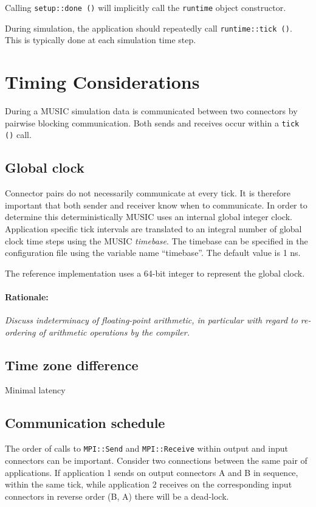 \documentclass[a4paper]{report}
\newenvironment{rationale}%
{\par\paragraph{Rationale:}}%
{\par}
\begin{document}
Calling \lstinline|setup::done ()| will implicitly call the \lstinline|runtime|
object constructor.

During simulation, the application should repeatedly call
\lstinline|runtime::tick ()|.  This is typically done at each simulation
time step.

\section{Timing Considerations}

During a MUSIC simulation data is communicated between two connectors
by pairwise blocking communication.  Both sends and receives occur
within a \lstinline|tick ()| call.

\subsection{Global clock}

Connector pairs do not necessarily communicate at every tick.  It is
therefore important that both sender and receiver know when to
communicate.  In order to determine this deterministically MUSIC uses
an internal global integer clock.  Application specific tick intervals
are translated to an integral number of global clock time steps using
the MUSIC \emph{timebase}.  The timebase can be specified in the
configuration file using the variable name ``timebase''.  The default
value is 1 ns.

The reference implementation uses a 64-bit integer to represent the
global clock.

\begin{rationale}
  \emph{Discuss indeterminacy of floating-point arithmetic, in particular
    with regard to re-ordering of arithmetic operations by the compiler.}
\end{rationale}

\subsection{Time zone difference}

Minimal latency

\subsection{Communication schedule}

The order of calls to \lstinline|MPI::Send| and \lstinline|MPI::Receive| within
output and input connectors can be important.  Consider two
connections between the same pair of applications.  If application 1
sends on output connectors A and B in sequence, within the same tick,
while application 2 receives on the corresponding input connectors in
reverse order (B, A) there will be a dead-lock.
\end{document}
